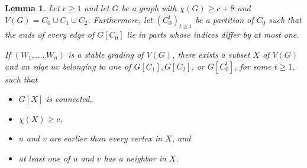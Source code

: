 \documentclass{article}
\newtheorem{lemma}[theorem]{Lemma}
\begin{document}
\begin{lemma}\label{lemma1:beyond_leveling}
    Let $c \geq 1$ and let $G$ be a graph with $\chi(G) \geq c + 8$ and $V(G) = C_0 \cup C_1 \cup C_2$.
    Furthermore, let \((C_0^t)_{t\geq 1}\) be a partition of \(C_0\) such that the ends of every edge of \(G[C_0]\) lie in parts whose indices differ by at most one.

    If $(W_1, \dots, W_n)$ is a stable grading of $V(G)$, there exists a subset $X$ of $V(G)$ and an edge $uv$ belonging to one of $G[C_1], G[C_2]$, or $G[C_0^t]$, for some $t \geq 1$, such that
    \begin{itemize}
        \item $G[X]$ is connected,
        \item $\chi(X) \geq c$,
        \item $u$ and $v$ are earlier than every vertex in $X$, and
        \item at least one of $u$ and $v$ has a neighbor in $X$.
    \end{itemize}
        \end{lemma}
\end{document}
